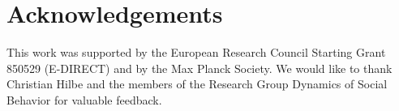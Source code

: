 \documentclass[11pt]{article}
\theoremstyle{plainCl1}
\theoremstyle{plainCl2}
\begin{document}




\section*{Acknowledgements}
This work was supported by the European Research Council Starting Grant 850529 (E-DIRECT) and by the Max Planck Society. We would like to thank Christian Hilbe and the members of the Research Group Dynamics of Social Behavior for valuable feedback.
\newpage
\end{document}
